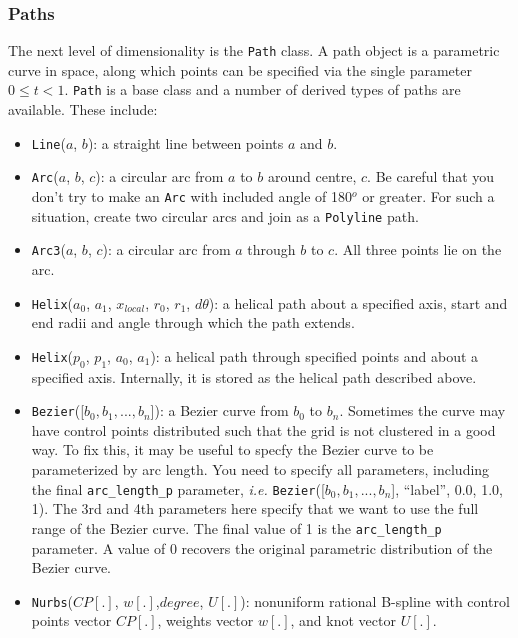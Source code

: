 \subsubsection{Paths}
%
The next level of dimensionality is the \texttt{Path} class.
A path object is a parametric curve in space, 
along which points can be specified via the single parameter $0 \le t < 1$.
\texttt{Path} is a base class and a number of derived types of paths are available.
These include:
\begin{itemize}
\item \texttt{Line}($a$, $b$): a straight line between points $a$ and $b$.
\item \texttt{Arc}($a$, $b$, $c$): a circular arc from $a$ to $b$ around centre,
  $c$.
  Be careful that you don't try to make an \texttt{Arc} with included angle of 180$^o$ or greater.
  For such a situation, create two circular arcs and join as a \texttt{Polyline} path.
\item \texttt{Arc3}($a$, $b$, $c$): a circular arc from $a$ through $b$ to $c$.
  All three points lie on the arc.
\item \texttt{Helix}($a_0$, $a_1$, $x_{local}$, $r_0$, $r_1$, $d\theta$): a helical path
  about a specified axis, start and end radii and angle through which the path extends.
\item \texttt{Helix}($p_0$, $p_1$, $a_0$, $a_1$): a helical path through specified points
  and about a specified axis.
  Internally, it is stored as the helical path described above.
\item \texttt{Bezier}([$b_0, b_1, ..., b_n$]): a Bezier curve from $b_0$ to
  $b_n$.
  Sometimes the curve may have control points distributed such that the grid is not clustered in a good way.
  To fix this, it may be useful to specfy the Bezier curve to be parameterized by arc length.
  You need to specify all parameters, including the final \verb!arc_length_p! parameter, \textit{i.e.}
  \verb!Bezier!([$b_0, b_1, ..., b_n$], ``label'', 0.0, 1.0, 1).
  The 3rd and 4th parameters here specify that we want to use the full range of the Bezier curve.
  The final value of 1 is the \verb!arc_length_p! parameter.  
  A value of 0 recovers the original parametric distribution of the Bezier curve.
\item \texttt{Nurbs}($CP[.]$, $w[.]$,$degree$, $U[.]$): nonuniform rational B-spline with
  control points vector $CP[.]$, weights vector $w[.]$, and knot vector $U[.]$.

\end{itemize}

